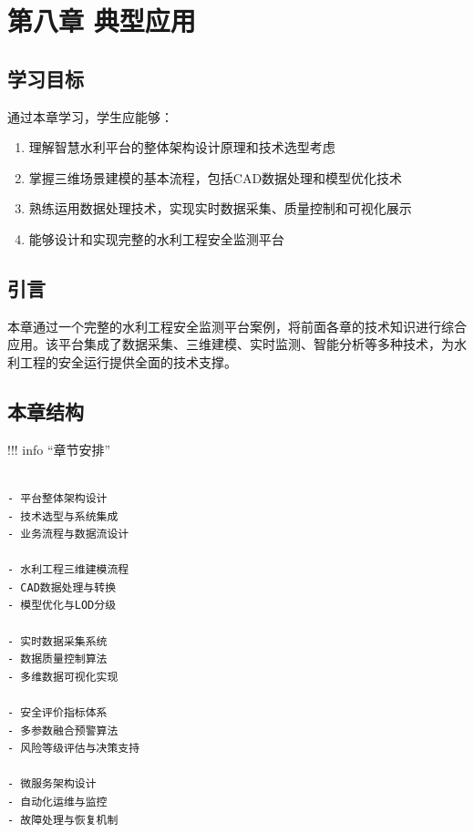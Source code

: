 \section{第八章 典型应用}\label{ux7b2cux516bux7ae0-ux5178ux578bux5e94ux7528}

\subsection{学习目标}\label{ux5b66ux4e60ux76eeux6807}

通过本章学习，学生应能够：

\begin{enumerate}
\def\labelenumi{\arabic{enumi}.}
\tightlist
\item
  理解智慧水利平台的整体架构设计原理和技术选型考虑
\item
  掌握三维场景建模的基本流程，包括CAD数据处理和模型优化技术
\item
  熟练运用数据处理技术，实现实时数据采集、质量控制和可视化展示
\item
  能够设计和实现完整的水利工程安全监测平台
\end{enumerate}

\subsection{引言}\label{ux5f15ux8a00}

本章通过一个完整的水利工程安全监测平台案例，将前面各章的技术知识进行综合应用。该平台集成了数据采集、三维建模、实时监测、智能分析等多种技术，为水利工程的安全运行提供全面的技术支撑。

\subsection{本章结构}\label{ux672cux7ae0ux7ed3ux6784}

!!! info ``章节安排''

\begin{verbatim}

- 平台整体架构设计
- 技术选型与系统集成
- 业务流程与数据流设计

- 水利工程三维建模流程
- CAD数据处理与转换
- 模型优化与LOD分级

- 实时数据采集系统
- 数据质量控制算法
- 多维数据可视化实现

- 安全评价指标体系
- 多参数融合预警算法
- 风险等级评估与决策支持

- 微服务架构设计
- 自动化运维与监控
- 故障处理与恢复机制
\end{verbatim}

